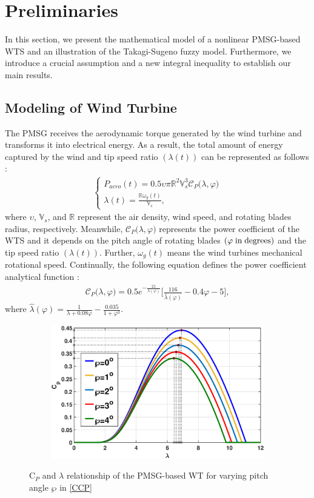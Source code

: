 \documentclass[preprint,11pt]{elsarticle}
\begin{document}
\section{Preliminaries}\vspace{-0.3cm}
{In this section, we present the mathematical model of a nonlinear PMSG-based WTS and an illustration of the Takagi-Sugeno fuzzy model. Furthermore, we introduce a crucial assumption and a new integral inequality to establish our main results.}
\vspace{-0.3cm}
\subsection{{Modeling of Wind Turbine}}
{The PMSG receives the aerodynamic torque generated by the wind turbine and transforms it into electrical energy. As a result, the total amount of energy captured by the wind and tip speed ratio $(\lambda(t))$ can be represented as follows \cite{vel1,sub1}:}
\begin{eqnarray*}
\begin{cases}
{P}_{aero}(t)= 0.5 \upsilon\pi  \mathbb{R}^2 \mathbb{V}^3_s\mathcal{C}_P\big( {\lambda},\varphi \big)\\
\lambda(t)=\frac{\mathbb{R}\omega_g(t)}{\mathbb{V}_s},
\end{cases}
\end{eqnarray*}
where $\upsilon$, $\mathbb{V}_s$,  and $\mathbb{R}$ represent the air density, wind speed,  and rotating blades radius, respectively.
Meanwhile, $\mathcal{C}_P\big( {\lambda},\varphi \big)$ represents the power coefficient of the WTS and it depends on the pitch angle of rotating blades $(\varphi\;\mbox{in\;degrees})$ and the tip speed ratio $(\lambda(t))$. Further, $\omega_g(t)$ means the wind turbines mechanical rotational speed. Continually, the following equation defines the power coefficient analytical function \cite{vel1,sub1}:
\begin{eqnarray}
\mathcal{C}_P\big( {\lambda},\varphi \big)=0.5e^{-\frac{21}{\lambda(\varphi)}}\Big[\frac{116}{{\widehat{\lambda}(\varphi)}}-0.4\varphi-5 \Big],\label{CCP}
\end{eqnarray}
where
$
{\widehat{\lambda}(\varphi)}=\frac{1}{\lambda+0.08\varphi}-\frac{0.035}{1+\varphi^3}.
$
\begin{figure}[!ht]\vspace{-0.4cm}
\centering
\includegraphics[height=5.8cm,width=11.5cm]{cp.eps}\\
\caption{$\mathrm{C}_{P}$ and $\lambda$ relationship of the PMSG-based WT for varying pitch angle $\wp$ in \eqref{CCP}}\label{CP}
\end{figure}
\end{document}
